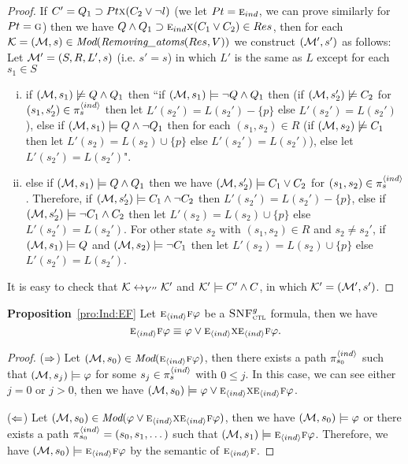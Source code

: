 \documentclass[letterpaper]{article} %
\begin{document}
\begin{proof}
If $C'= Q_1\supset Pt \textsc{x} (C_2 \vee \neg l)$ (we let $Pt=\textsc{e}_{ind}$, we can prove similarly for $Pt = \textsc{g}$) then we have $Q \wedge Q_1 \supset \textsc{e}_{ind} \textsc{x}(C_1 \vee C_2) \in Res$, then for each ${\cal K}=({\cal M}, s)\in \textit{Mod}(\emph{Removing\_atoms}(Res, V))$ we construct $({\cal M}',s')$ as follows: Let ${\cal M}'= (S, R, L',s)$ (i.e. $s'=s$) in which $L'$ is the same as $L$ except for each $s_1\in S$
\begin{enumerate}[(i)]
    \item if $({\cal M}, s_1) \not \models Q \wedge Q_1$ then ``if $({\cal M}, s_1) \models \neg Q \wedge Q_1$ then (if $({\cal M}, s_2') \not \models C_2$ for $(s_1, s_2') \in \pi_s^{{\langle{ind}\rangle}}$ then let $L'(s_2') = L(s_2') - \{p\}$ else $L'(s_2') = L(s_2')$), else if $({\cal M}, s_1) \models Q \wedge \neg Q_1$ then for each $(s_1, s_2) \in R$ (if $({\cal M}, s_2) \not \models C_1$ then let $L'(s_2) = L(s_2) \cup \{p\}$ else $L'(s_2') = L(s_2')$), else let $L'(s_2') = L(s_2')$".
    \item else if $({\cal M}, s_1) \models Q \wedge Q_1$ then we have $({\cal M},s_2') \models C_1 \vee C_2$ for $(s_1, s_2) \in \pi_s^{{\langle{ind}\rangle}}$. Therefore, if $({\cal M}, s_2') \models C_1 \wedge \neg C_2$ then $L'(s_2') = L(s_2') - \{p\}$, else if  $({\cal M}, s_2') \models \neg C_1 \wedge C_2$ then let $L'(s_2) = L(s_2) \cup \{p\}$ else $L'(s_2') = L(s_2')$. For other state $s_2$ with $(s_1, s_2) \in R$ and $s_2 \not = s_2'$, if $({\cal M}, s_1) \models Q$ and $({\cal M}, s_2) \models \neg C_1$ then let $L'(s_2) = L(s_2) \cup \{p\}$ else $L'(s_2') = L(s_2')$.
\end{enumerate}
It is easy to check that ${\cal K} \leftrightarrow_{V''} {\cal K}'$ and ${\cal K}' \models C' \wedge C$, in which ${\cal K}' = ({\cal M}',s')$.  
\end{proof}


\noindent\textbf{Proposition}~\ref{pro:Ind:EF}
Let $\textsc{e}_{{\langle{ind}\rangle}} \textsc{f} \varphi$ be a ${\textsc{SNF}_{\textsc{ctl}}^g}$ formula, then we have 
\[
\textsc{e}_{{\langle{ind}\rangle}} \textsc{f} \varphi \equiv \varphi \vee \textsc{e}_{{\langle{ind}\rangle}} \textsc{x} \textsc{e}_{{\langle{ind}\rangle}}\textsc{f} \varphi.
\]
\begin{proof}
($\Rightarrow$) Let $({\cal M}, s_0) \in \textit{Mod}(\textsc{e}_{{\langle{ind}\rangle}} \textsc{f} \varphi)$, then there exists a path $\pi_{s_0}^{{\langle{ind}\rangle}}$ such that $({\cal M}, s_j) \models \varphi$ for some $s_j \in \pi_s^{{\langle{ind}\rangle}}$ with $0 \leq j$. In this case, we can see either $j=0$ or $j > 0$, then we have $({\cal M}, s_0) \models  \varphi \vee \textsc{e}_{{\langle{ind}\rangle}} \textsc{x} \textsc{e}_{{\langle{ind}\rangle}}\textsc{f} \varphi$.

($\Leftarrow$) Let $({\cal M}, s_0) \in \textit{Mod}(\varphi \vee \textsc{e}_{{\langle{ind}\rangle}} \textsc{x} \textsc{e}_{{\langle{ind}\rangle}}\textsc{f} \varphi)$, then we have $({\cal M},s_0) \models \varphi$ or there exists a path $\pi_{s_0}^{{\langle{ind}\rangle}} = (s_0, s_1, \dots)$ such that $({\cal M}, s_1) \models \textsc{e}_{{\langle{ind}\rangle}}\textsc{f} \varphi$. Therefore, we have $({\cal M}, s_0) \models \textsc{e}_{{\langle{ind}\rangle}} \textsc{f} \varphi$ by the semantic of $\textsc{e}_{{\langle{ind}\rangle}}\textsc{f}$.
\end{proof}
\end{document}
